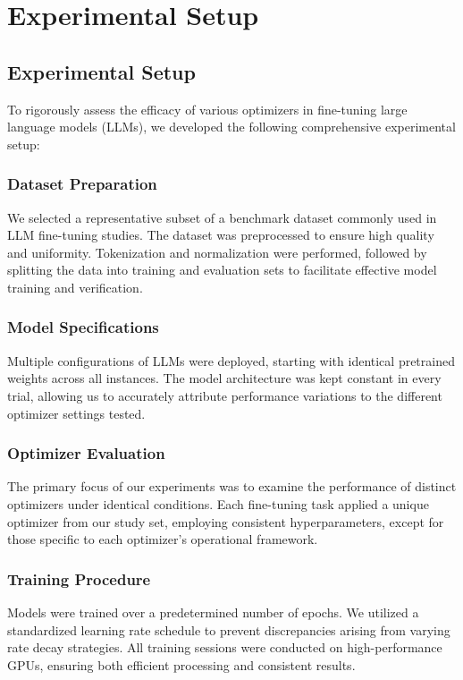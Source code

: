 \documentclass{article} %
\begin{document}
\section{Experimental Setup}
\label{sec:experimental}
\subsection{Experimental Setup}

To rigorously assess the efficacy of various optimizers in fine-tuning large language models (LLMs), we developed the following comprehensive experimental setup:

\subsubsection{Dataset Preparation}
We selected a representative subset of a benchmark dataset commonly used in LLM fine-tuning studies. The dataset was preprocessed to ensure high quality and uniformity. Tokenization and normalization were performed, followed by splitting the data into training and evaluation sets to facilitate effective model training and verification.

\subsubsection{Model Specifications}
Multiple configurations of LLMs were deployed, starting with identical pretrained weights across all instances. The model architecture was kept constant in every trial, allowing us to accurately attribute performance variations to the different optimizer settings tested.

\subsubsection{Optimizer Evaluation}
The primary focus of our experiments was to examine the performance of distinct optimizers under identical conditions. Each fine-tuning task applied a unique optimizer from our study set, employing consistent hyperparameters, except for those specific to each optimizer's operational framework.

\subsubsection{Training Procedure}
Models were trained over a predetermined number of epochs. We utilized a standardized learning rate schedule to prevent discrepancies arising from varying rate decay strategies. All training sessions were conducted on high-performance GPUs, ensuring both efficient processing and consistent results.
\end{document}
